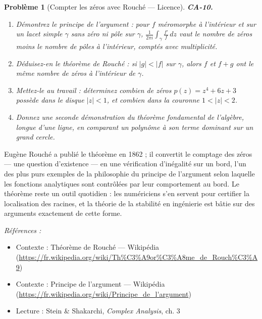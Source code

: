 \documentclass[11pt]{article}
\newtheorem{problem}{Problème}
\newenvironment{refs}{\par\small\noindent\emph{Références :}\begin{itemize}\setlength\itemsep{0pt}}{\end{itemize}\normalsize}
\begin{document}
\bigskip

\begin{problem}[{Compter les zéros avec Rouché --- Licence}]
\textbf{CA-10.} \begin{enumerate}
\item[(a)] Démontrez le principe de l'argument : pour $ f $ méromorphe
à l'intérieur et sur un lacet simple $ \gamma $ sans zéro ni pôle sur $ \gamma $,
$ \frac{1}{2\pi i} \int_\gamma \frac{f'}{f}\,dz $ vaut le nombre de zéros moins le
nombre de pôles à l'intérieur, comptés avec multiplicité.
\item[(b)] Déduisez-en le théorème de Rouché : si
$ |g| < |f| $ sur $ \gamma $, alors $ f $ et $ f + g $ ont le même nombre de zéros
à l'intérieur de $ \gamma $.
\item[(c)] Mettez-le au travail : déterminez combien de zéros
$ p(z) = z^4 + 6z + 3 $ possède dans le disque $ |z| < 1 $, et combien dans la couronne
$ 1 < |z| < 2 $.
\item[(d)] Donnez une seconde démonstration du théorème fondamental de l'algèbre, longue
d'une ligne, en comparant un polynôme à son terme dominant sur un grand cercle.
\end{enumerate}

\end{problem}

\noindent Eugène Rouché a publié le théorème en 1862 ; il convertit le comptage des
zéros --- une question d'existence --- en une vérification d'inégalité sur un bord, l'un des plus purs
exemples de la philosophie du principe de l'argument selon laquelle les fonctions analytiques sont
contrôlées par leur comportement au bord. Le théorème reste un outil quotidien : les numériciens
s'en servent pour certifier la localisation des racines, et la théorie de la stabilité en ingénierie
est bâtie sur des arguments exactement de cette forme.

\begin{refs}
\item Contexte : Théorème de Rouché --- Wikipédia (\url{https://fr.wikipedia.org/wiki/Th%C3%A9or%C3%A8me_de_Rouch%C3%A9})
\item Contexte : Principe de l'argument --- Wikipédia (\url{https://fr.wikipedia.org/wiki/Principe_de_l'argument})
\item Lecture : Stein \& Shakarchi, \textit{Complex Analysis}, ch. 3
\end{refs}

\bigskip
\end{document}
